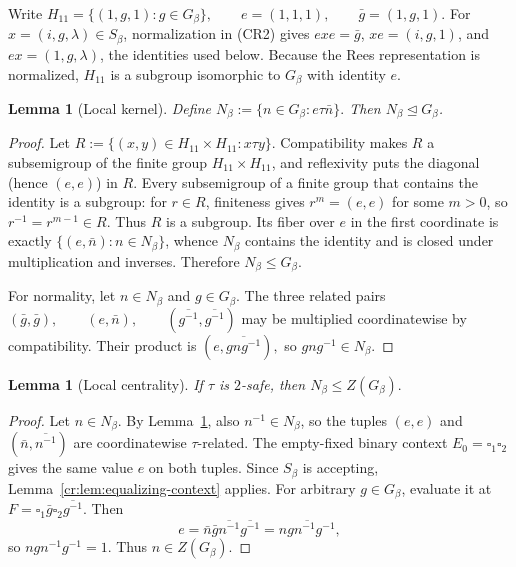 \documentclass[10pt,a4paper]{article}
\newtheorem{lemma}[theorem]{Lemma}
\theoremstyle{definition}
\theoremstyle{remark}
\newcommand{\blank}{\square}
\begin{document}
Write
\(H_{11}=\{(1,g,1):g\in G_\beta\}, \qquad e=(1,1,1), \qquad \bar g=(1,g,1).\)
For \(x=(i,g,\lambda)\in S_\beta\), normalization in \textup{(CR2)} gives
\(exe=\bar g\), \(xe=(i,g,1)\), and \(ex=(1,g,\lambda)\), the identities
used below.
Because the Rees representation is normalized, $H_{11}$ is a subgroup
isomorphic to $G_\beta$ with identity $e$.

\begin{lemma}[Local kernel]
\label{cr:lem:local-kernel}
Define
\(
N_\beta:=\{n\in G_\beta:e\tau\bar n\}.
\)
Then $N_\beta\trianglelefteq G_\beta$.
\end{lemma}

\begin{proof}
Let
\(R:=\{(x,y)\in H_{11}\times H_{11}:x\tau y\}.\)
Compatibility makes $R$ a subsemigroup of the finite group
$H_{11}\times H_{11}$, and reflexivity puts the diagonal (hence $(e,e)$) in
$R$. Every subsemigroup of a finite group that contains the identity is a
subgroup: for $r\in R$, finiteness gives $r^m=(e,e)$ for some $m>0$, so
$r^{-1}=r^{m-1}\in R$. Thus $R$ is a subgroup. Its fiber over $e$ in the
first coordinate is exactly $\{(e,\bar n):n\in N_\beta\}$, whence
$N_\beta$ contains the identity and is closed under multiplication and
inverses. Therefore $N_\beta\le G_\beta$.

For normality, let $n\in N_\beta$ and $g\in G_\beta$. The three related pairs
\((\bar g,\bar g),\qquad (e,\bar n),\qquad (\overline{g^{-1}},\overline{g^{-1}})\)
may be multiplied coordinatewise by compatibility. Their product is
\((e,\overline{gng^{-1}}),\)
so $gng^{-1}\in N_\beta$.
\end{proof}

\begin{lemma}[Local centrality]
\label{cr:lem:local-central}
If $\tau$ is $2$-safe, then
\(N_\beta\le Z(G_\beta).\)
\end{lemma}

\begin{proof}
Let $n\in N_\beta$.  By Lemma~\ref{cr:lem:local-kernel}, also
$n^{-1}\in N_\beta$, so the tuples
\((e,e)\) and \((\bar n,\overline{n^{-1}})\) are coordinatewise
$\tau$-related.  The empty-fixed binary context
$E_0=\blank_1\blank_2$ gives the same value $e$ on both tuples.  Since
$S_\beta$ is accepting, Lemma~\ref{cr:lem:equalizing-context} applies.
For arbitrary $g\in G_\beta$, evaluate it at
\(F=\blank_1\bar g\blank_2\overline{g^{-1}}.\)
Then
\[
e
=
\bar n\bar g\overline{n^{-1}}\overline{g^{-1}}
=
\overline{ngn^{-1}g^{-1}},
\]
so $ngn^{-1}g^{-1}=1$.  Thus $n\in Z(G_\beta)$.
\end{proof}
\end{document}
